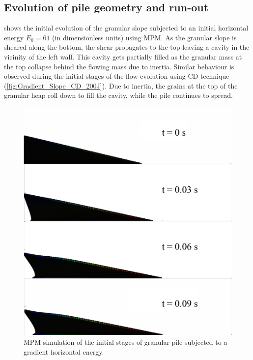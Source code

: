 \subsection{Evolution of pile geometry and run-out}
\label{sec:evolution}

 shows the initial evolution of the 
granular slope subjected to an initial horizontal energy $E_0 = 61$ (in 
dimensionless units) using MPM. As the granular slope is sheared along the 
bottom, the shear propagates to the top leaving a cavity in the vicinity of the 
left wall. This cavity gets partially filled as the granular mass at the top 
collapse behind the flowing mass due to inertia. Similar behaviour is observed 
during the initial stages of the flow evolution using CD technique 
(\cref{fig:Gradient_Slope_CD_200J}). Due to inertia, the grains at the top 
of the granular heap roll down to fill the cavity, while the pile continues to 
spread. 

\begin{figure}[tbph]
\centering
\includegraphics[width=\textwidth]{Gradient_Slope_Profile_200J}
\caption{MPM simulation of the initial stages of granular pile subjected to a 
gradient horizontal energy.}
\label{fig:Gradient_Slope_Profile_200J}
\end{figure}

